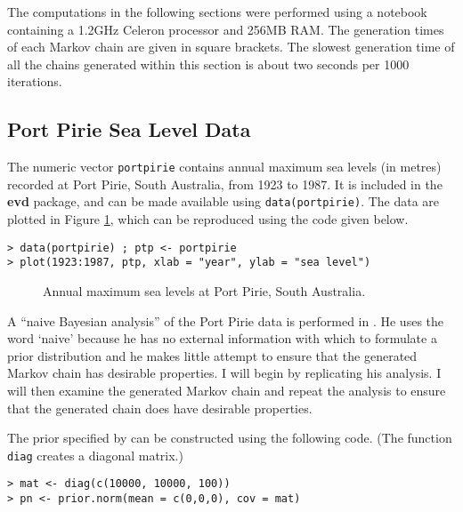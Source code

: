 \documentclass[11pt,a4paper]{article}
\begin{document}
The computations in the following sections were performed using a
notebook containing a 1.2GHz Celeron processor and 256MB RAM\@.  The
generation times of each Markov chain are given in square brackets.
The slowest generation time of all the chains generated within this
section is about two seconds per 1000 iterations.

\subsection{Port Pirie Sea Level Data}
\label{egpirie}

The numeric vector \verb+portpirie+ contains annual maximum sea levels
(in metres) recorded at Port Pirie, South Australia, from 1923 to
1987.  It is included in the \textbf{evd} package, and can be made
available using \verb+data(portpirie)+.  The data are plotted in
Figure \ref{piriedata}, which can be reproduced using the code given
below.

\begin{verbatim}
> data(portpirie) ; ptp <- portpirie
> plot(1923:1987, ptp, xlab = "year", ylab = "sea level")
\end{verbatim}

\begin{figure}
\begin{center}
\vspace{-1.5cm}
\end{center}
\caption{Annual maximum sea levels at Port Pirie, South Australia.}
\label{piriedata}
\end{figure}

A ``naive Bayesian analysis'' of the Port Pirie data is performed in
\citet[][Section 9.1.3]{cole01}.  He uses the word `naive' because he
has no external information with which to formulate a prior
distribution and he makes little attempt to ensure that the generated
Markov chain has desirable properties.  I will begin by replicating
his analysis.  I will then examine the generated Markov chain and
repeat the analysis to ensure that the generated chain does have
desirable properties.

The prior specified by \citet{cole01} can be constructed using the
following code. (The function \verb+diag+ creates a diagonal matrix.)

\begin{verbatim}
> mat <- diag(c(10000, 10000, 100))
> pn <- prior.norm(mean = c(0,0,0), cov = mat)
\end{verbatim}
\end{document}
